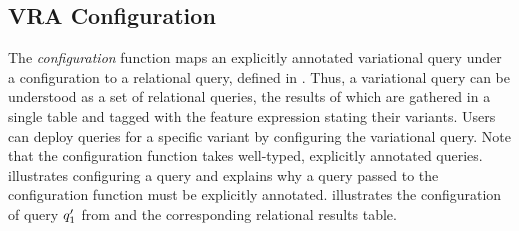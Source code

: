 \subsection{VRA Configuration}
\label{sec:vraconf}

%

%
The \emph{configuration} function maps an explicitly annotated variational query under
a configuration
to a relational query, defined in . Thus, a variational query 
can be understood as a set of relational queries, the results of which are gathered
in a single table and tagged with the feature expression stating their variants.
%
Users can deploy queries for a specific variant by configuring 
the variational query.
%
Note that the configuration function takes well-typed, explicitly annotated queries.
 illustrates configuring a query and explains 
why a query passed to the configuration function must be explicitly annotated.
 illustrates the configuration of query $\VVal {\vQ_1}$ from  and the corresponding relational results table.
%

